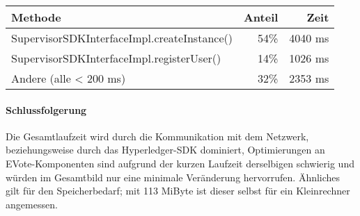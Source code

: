 \documentclass[parskip=full]{scrartcl}
\begin{document}
\begin{table}[h!]
	\begin{tabular}[t]{lrr}
		Methode & Anteil & Zeit \\ \hline
		SupervisorSDKInterfaceImpl.createInstance() & 54\% & 4040 ms \\
		SupervisorSDKInterfaceImpl.registerUser() & 14\% & 1026 ms \\
		Andere (alle < 200 ms) & 32\% & 2353 ms
	\end{tabular}
\end{table}
%
%

\paragraph{Schlussfolgerung}
Die Gesamtlaufzeit wird durch die Kommunikation mit dem Netzwerk, beziehungsweise durch das Hyperledger-SDK dominiert, Optimierungen an EVote-Komponenten sind aufgrund der kurzen Laufzeit derselbigen schwierig und würden im Gesamtbild nur eine minimale Veränderung hervorrufen. Ähnliches gilt für den Speicherbedarf; mit 113 MiByte ist dieser selbst für ein Kleinrechner angemessen.
\end{document}
